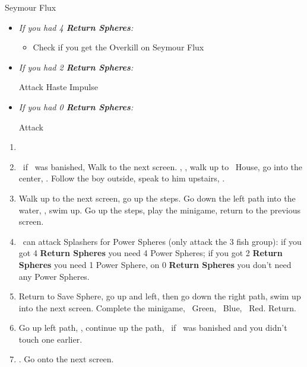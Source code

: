 \begin{battle}[70000]{Seymour Flux}
    \begin{itemize}
        \item \textit{If you had 4 \textbf{Return Spheres}:}
        \begin{itemize}
            \yunaf Attack
            \tidusf Haste \yuna
            \switch{\auron}{\rikku}
            \rikkuf \od\ HP Sphere + Grenade or Silence Grenade
            \summon{\bahamut}
            \bahamutf \textit{If you used a Silence Grenade} Impulse, otherwise Attack
            \yunaf Attack
            \tidusf \textit{If you used a Silence Grenade} Attack once, otherwise Defend
            \rikkuf Defend
            \item Check if you get the Overkill on Seymour Flux
        \end{itemize}
        \item \textit{If you had 2 \textbf{Return Spheres}:}
        \begin{itemize}
            \yunaf Attack
            \tidusf Haste \yuna
            \summon{\bahamut}
            \bahamutf Impulse
        \end{itemize}
        \item \textit{If you had 0 \textbf{Return Spheres}:}
        \begin{itemize}
            \switch{\tidus}{\yuna}
            \summon{\bahamut}
            \bahamutf Attack
        \end{itemize}
    \end{itemize}
\end{battle}
\begin{enumerate}[resume]
    \item \formation{\tidus}{\kimahri}{\auron}
    \item \save\ if \bahamut\ was banished, Walk to the next screen. \skippablefmv[0:20], \sd, walk up to \tidus\ House, go into the center, \sd. Follow the boy outside, speak to him upstairs, \sd.
    \item Walk up to the next screen, go up the steps. Go down the left path into the water, \sd, swim up. Go up the steps, play the minigame, return to the previous screen.
    \item \tidus\ can attack Splashers for Power Spheres (only attack the 3 fish group): if you got 4 \textbf{Return Spheres} you need 4 Power Spheres; if you got 2 \textbf{Return Spheres} you need 1 Power Sphere, on 0 \textbf{Return Spheres} you don't need any Power Spheres.
    \item Return to Save Sphere, go up and left, then go down the right path, swim up into the next screen. Complete the minigame, \rikku\ Green, \tidus\ Blue, \wakka\ Red. Return.
    \item Go up left path, \sd, continue up the path, \save\ if \bahamut\ was banished and you didn't touch one earlier.
    \item \formation{\tidus}{\yuna}{\wakka}. Go onto the next screen.
\end{enumerate}
